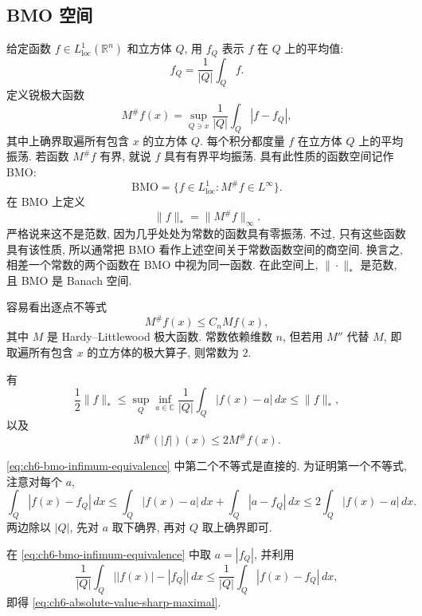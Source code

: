 \hypertarget{chapter-06-page-129}{}
\subsection{BMO 空间}
\label{sec:ch6-bmo}

给定函数 $f\in L^1_{\mathrm{loc}}(\mathbb R^n)$ 和立方体 $Q$, 用 $f_Q$ 表示 $f$ 在 $Q$ 上的平均值:
\[
 f_Q=\frac1{|Q|}\int_Qf.
\]
定义锐极大函数
\begin{equation}
\label{eq:ch6-sharp-maximal-function}
 M^\#f(x)=\sup_{Q\ni x}\frac1{|Q|}\int_Q|f-f_Q|,
\end{equation}
其中上确界取遍所有包含 $x$ 的立方体 $Q$. 每个积分都度量 $f$ 在立方体 $Q$ 上的平均振荡. 若函数 $M^\#f$ 有界, 就说 $f$ 具有有界平均振荡. 具有此性质的函数空间记作 BMO:
\[
 \mathrm{BMO}=\{f\in L^1_{\mathrm{loc}}:M^\#f\in L^\infty\}.
\]
在 BMO 上定义
\[
 \|f\|_*=\|M^\#f\|_\infty.
\]
严格说来这不是范数, 因为几乎处处为常数的函数具有零振荡. 不过, 只有这些函数具有该性质, 所以通常把 BMO 看作上述空间关于常数函数空间的商空间. 换言之, 相差一个常数的两个函数在 BMO 中视为同一函数. 在此空间上, $\|\cdot\|_*$ 是范数, 且 BMO 是 Banach 空间.

容易看出逐点不等式
\[
 M^\#f(x)\le C_nMf(x),
\]
其中 $M$ 是 Hardy--Littlewood 极大函数. 常数依赖维数 $n$, 但若用 $M''$ 代替 $M$, 即取遍所有包含 $x$ 的立方体的极大算子, 则常数为 $2$.

\begin{Proposition}
\label{prop:ch6-bmo-equivalent-oscillation}
有
\begin{equation}
\label{eq:ch6-bmo-infimum-equivalence}
 \frac12\|f\|_*
 \le\sup_Q\inf_{a\in\mathbb C}\frac1{|Q|}\int_Q|f(x)-a|\,dx
 \le\|f\|_*,
\end{equation}
以及
\begin{equation}
\label{eq:ch6-absolute-value-sharp-maximal}
 M^\#(|f|)(x)\le2M^\#f(x).
\end{equation}
\end{Proposition}

\hypertarget{chapter-06-page-130}{}
\begin{Proof}
\eqref{eq:ch6-bmo-infimum-equivalence} 中第二个不等式是直接的. 为证明第一个不等式, 注意对每个 $a$,
\[
 \int_Q|f(x)-f_Q|\,dx
 \le\int_Q|f(x)-a|\,dx+\int_Q|a-f_Q|\,dx
 \le2\int_Q|f(x)-a|\,dx.
\]
两边除以 $|Q|$, 先对 $a$ 取下确界, 再对 $Q$ 取上确界即可.

在 \eqref{eq:ch6-bmo-infimum-equivalence} 中取 $a=|f_Q|$, 并利用
\[
 \frac1{|Q|}\int_Q\bigl||f(x)|-|f_Q|\bigr|\,dx
 \le\frac1{|Q|}\int_Q|f(x)-f_Q|\,dx,
\]
即得 \eqref{eq:ch6-absolute-value-sharp-maximal}.
\end{Proof}

